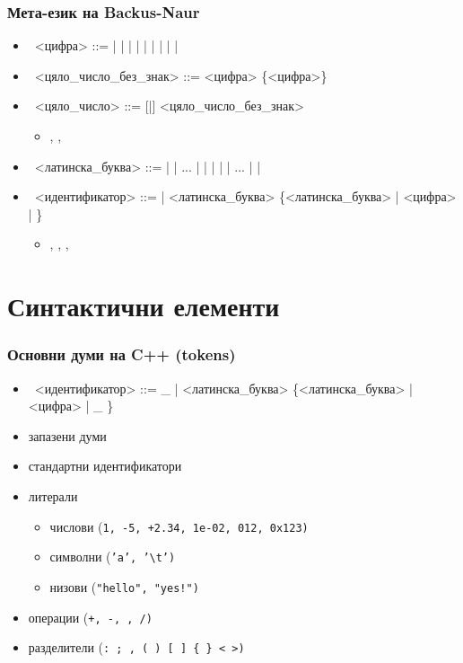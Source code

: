 \documentclass[alsotrans]{beamerswitch}
\begin{document}
\begin{frame}
  \frametitle{Мета-език на Backus-Naur}
  \begin{itemize}[<+->]
  \item\ <цифра> ::=  |  |  |  |  |  |  |  |  | 
  \item\ <цяло\_число\_без\_знак> ::= <цифра> \{<цифра>\}
  \item\ <цяло\_число> ::= [\tta{+}|\tta{-}] <цяло\_число\_без\_знак>
    \begin{itemize}
    \item {}, , 
    \end{itemize}
  \item\ <латинска\_буква> ::=  |  | ... |  |  |  |  | ... |  | 
  \item\ <идентификатор> ::=  \tta{\_} | <латинска\_буква> \{<латинска\_буква> | <цифра> | \tta{\_} \}
    \begin{itemize}
    \item {}, , , 
    \end{itemize}
  \end{itemize}
\end{frame}

\section{Синтактични елементи}

\begin{frame}
  \frametitle{Основни думи на C++ (tokens)}
  \begin{itemize}[<+->]
  \item\ <идентификатор> ::= \tta\_ | <латинска\_буква> \{<латинска\_буква> |
      <цифра> | \tta\_ \}
  \item запазени думи
  \item стандартни идентификатори
  \item литерали
    \begin{itemize}
    \item числови (\tt1, \tt{-5}, \tt{+2.34}, \tt{1e-02}, \tt{012}, \tt{0x123})
    \item символни (\tt{'a'}, \tt{'\textbackslash{}t'})
    \item низови (\tt{"hello"}, \tt{"yes!"})
    \end{itemize}
  \item операции (\tt+, \tt-, \tt*, \tt/)
  \item разделители (\tt{: ; , ( ) [ ] \{ \} < >})
  \end{itemize}
\end{frame}
\end{document}
